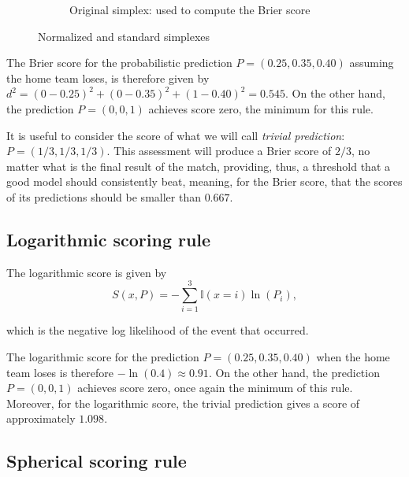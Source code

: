 \documentclass[journal,article,accept,moreauthors,pdftex,12pt,a4paper]{mdpi}
\begin{document}
\begin{figure}[!ht]
\begin{subfigure}[b]{0.48\linewidth}
			
			
			\caption{Original simplex: used to compute the Brier score}
			\label{fig:B}
		\end{subfigure}
		\caption{Normalized and standard simplexes}
		\label{fig:norm_stand}
	\end{figure}
	
	The Brier score for the probabilistic prediction $P=(0.25,0.35,0.40)$
	assuming the home team loses, is therefore given by $d^2=(0-0.25)^2+(0-0.35)^2+(1-0.40)^2=0.545$.
	On the other hand, the prediction $P=(0,0,1)$ achieves score  zero, the minimum for this rule.
	
	It is useful to consider the score of what we will call {\it trivial prediction}:
	$P=(1/3,1/3,1/3)$.
	This assessment will produce a Brier score of $2/3$, no matter what is the final result of the match, providing, thus, a threshold that a good model should consistently beat, meaning, for the Brier score, that the scores of its predictions should be smaller than $0.667$.
	
	
	
	\subsection{Logarithmic scoring rule}
	
	The logarithmic  score is given by
	$$S(x,P)=- \sum_{i=1}^3\mathbb{I}(x=i)\ln(P_i),$$
	
	\noindent
	which is the negative log likelihood of the event that occurred.
	
	The logarithmic score for the prediction
	$P=(0.25,0.35,0.40)$
	when the home team loses is therefore
	$-\ln(0.4)\approx 0.91$.
	On the other hand, the prediction $P=(0,0,1)$ achieves score zero, once again the minimum of this rule.
	Moreover, for the logarithmic score, the trivial prediction gives a score of approximately $1.098$.
	
	\subsection{Spherical scoring rule}
	
\end{document}
